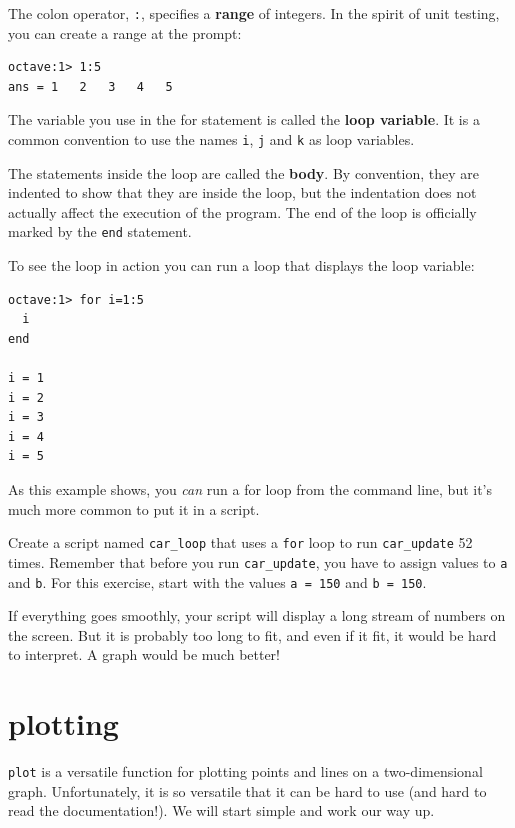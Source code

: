 \documentclass{book}
\begin{document}
The colon operator, {\tt :}, specifies a {\bf range} of integers. In
the spirit of unit testing, you can create a range at the prompt:

\begin{verbatim}
octave:1> 1:5
ans = 1   2   3   4   5
\end{verbatim}

The variable you use in the for statement is called the {\bf loop
variable}. It is a common convention to use the names {\tt i},
{\tt j} and {\tt k} as loop variables.

The statements inside the loop are called the {\bf body}. By convention,
they are indented to show that they are inside the loop, but the
indentation does not actually affect the execution of the program.
The end of the loop is officially marked by the {\tt end} statement.

To see the loop in action you can run a loop that displays the
loop variable:

\begin{verbatim}
octave:1> for i=1:5
  i
end

i = 1
i = 2
i = 3
i = 4
i = 5
\end{verbatim}

As this example shows, you {\em can} run a for loop from the
command line, but it's much more common to put it in a script.

\begin{ex}
Create a script named {\tt car\_loop} that uses a {\tt for}
loop to run {\tt car\_update} 52 times. Remember that before you run
{\tt car\_update}, you have to assign values to {\tt a} and {\tt b}.
For this exercise, start with the values {\tt a = 150} and {\tt b =
150}.

If everything goes smoothly, your script will display a long stream
of numbers on the screen. But it is probably too long
to fit, and even if it fit, it would be hard to interpret. 
A graph would be much better!
\end{ex}


\section{plotting}
\label{plotting}

{\tt plot} is a versatile function for plotting points and lines
on a two-dimensional graph. Unfortunately, it is so versatile
that it can be hard to use (and hard to read the documentation!).
We will start simple and work our way up.
\end{document}

